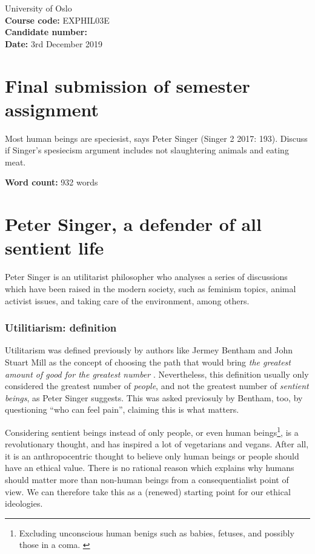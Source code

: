 \documentclass{article}
\newcommand{\q}[1]{``#1''}
\begin{document}
	\begin{flushright}
		University of Oslo
		\\\textbf{Course code:} EXPHIL03E
		\\\textbf{Candidate number:} 
		\\\textbf{Date:} 3rd December 2019
	\end{flushright}
\section*{Final submission of semester assignment}
Most human beings are speciesist, says Peter Singer (Singer 2 2017: 193). Discuss if Singer’s spesiecism argument includes not slaughtering animals and eating meat.%
		\begin{flushright}
			\textbf{Word count:} 932 words
		\end{flushright}
		\section*{Peter Singer, a defender of all sentient life}
		
		Peter Singer is an utilitarist philosopher who analyses a series of discussions which have been raised in the modern society, such as feminism topics, animal activist issues, and taking care of the environment, among others.

		\subsubsection*{Utilitiarism: definition}
		
		Utilitarism was defined previously by authors like Jermey Bentham and John Stuart Mill as the concept of choosing the path that would bring \emph{the greatest amount of good for the greatest number} \autocite{definitionutilitarism}. Nevertheless, this definition usually only considered the greatest number of \emph{people}, and not the greatest number of \emph{sentient beings}, as Peter Singer suggests. This was asked previosuly by Bentham, too, by questioning \q{who can feel pain}, claiming this is what matters.

		Considering sentient beings instead of only people, or even human beings\footnote{Excluding unconscious human benigs such as babies, fetuses, and possibly those in a coma. \autocite{singerpracticalethics}}, is a revolutionary thought, and has inspired a lot of vegetarians and vegans. After all, it is an anthropocentric thought to believe only human beings or people should have an ethical value. There is no rational reason which explains why humans should matter more than non-human beings from a consequentialist point of view. We can therefore take this as a (renewed) starting point for our ethical ideologies.
\end{document}
